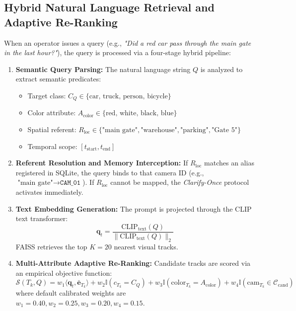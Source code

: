 \documentclass[12pt,a4paper]{article}
\begin{document}
\subsection{Hybrid Natural Language Retrieval and Adaptive Re-Ranking}
When an operator issues a query (e.g., \textit{"Did a red car pass through the main gate in the last hour?"}), the query is processed via a four-stage hybrid pipeline:
\begin{enumerate}
    \item \textbf{Semantic Query Parsing:} The natural language string $Q$ is analyzed to extract semantic predicates:
    \begin{itemize}
        \item Target class: $C_Q \in \{\text{car, truck, person, bicycle}\}$
        \item Color attribute: $A_{\text{color}} \in \{\text{red, white, black, blue}\}$
        \item Spatial referent: $R_{\text{loc}} \in \{\text{"main gate"}, \text{"warehouse"}, \text{"parking"}, \text{"Gate 5"}\}$
        \item Temporal scope: $[t_{\text{start}}, t_{\text{end}}]$
    \end{itemize}
    \item \textbf{Referent Resolution and Memory Interception:} If $R_{\text{loc}}$ matches an alias registered in SQLite, the query binds to that camera ID (e.g., $\text{"main gate"} \to \texttt{CAM\_01}$). If $R_{\text{loc}}$ cannot be mapped, the \textit{Clarify-Once} protocol activates immediately.
    \item \textbf{Text Embedding Generation:} The prompt is projected through the CLIP text transformer:
    \begin{equation}
    \mathbf{q}_t = \frac{\text{CLIP}_{\text{text}}(Q)}{\|\text{CLIP}_{\text{text}}(Q)\|_2}
    \end{equation}
    FAISS retrieves the top $K=20$ nearest visual tracks.
    \item \textbf{Multi-Attribute Adaptive Re-Ranking:} Candidate tracks are scored via an empirical objective function:
    \begin{equation}
    \mathcal{S}(T_k, Q) = w_1 \langle \mathbf{q}_t, \bar{\mathbf{e}}_{T_k} \rangle + w_2 \mathbb{I}(c_{T_k} = C_Q) + w_3 \mathbb{I}(\text{color}_{T_k} = A_{\text{color}}) + w_4 \mathbb{I}(\text{cam}_{T_k} \in \mathcal{C}_{\text{cand}})
    \end{equation}
    where default calibrated weights are $w_1 = 0.40, w_2 = 0.25, w_3 = 0.20, w_4 = 0.15$.
\end{enumerate}
\end{document}
